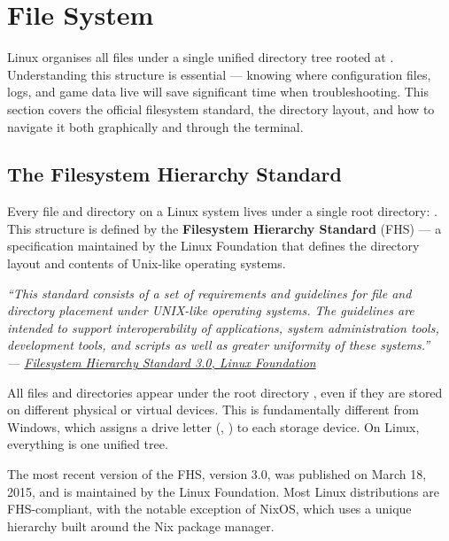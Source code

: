\documentclass{article}
\begin{document}
\newpage
\section{File System}

Linux organises all files under a single unified directory tree rooted at \directory{/}.
Understanding this structure is essential --- knowing where configuration files, logs,
and game data live will save significant time when troubleshooting. This section covers
the official filesystem standard, the directory layout, and how to navigate it both
graphically and through the terminal.

\subsection{The Filesystem Hierarchy Standard}

Every file and directory on a Linux system lives under a single root directory:
\directory{/}. This structure is defined by the \textbf{Filesystem Hierarchy
	Standard} (FHS) --- a specification maintained by the Linux Foundation that defines
the directory layout and contents of Unix-like operating systems.

\begin{mdframed}[linewidth=1.5pt, linecolor=black!50, topline=true, bottomline=true,
	leftline=false, rightline=false, backgroundcolor=black!3]
	\small\itshape
	``This standard consists of a set of requirements and guidelines for file and
	directory placement under UNIX-like operating systems. The guidelines are intended
	to support interoperability of applications, system administration tools,
	development tools, and scripts as well as greater uniformity of these systems.''\\[4pt]
	\normalfont\small ---
	\href{https://refspecs.linuxfoundation.org/FHS_3.0/fhs/index.html}{Filesystem
		Hierarchy Standard 3.0, Linux Foundation}
\end{mdframed}

\noindent All files and directories appear under the root directory \directory{/}, even
if they are stored on different physical or virtual devices.  This is
fundamentally different from Windows, which assigns a drive letter (,
) to each storage device. On Linux, everything is one unified tree.

\begin{tcolorbox}[arc=12pt, outer arc=10pt,
	colback=blue!4!white, colframe=blue!40!black,
	title=\textbf{FHS 3.0}]
	The most recent version of the FHS, version 3.0, was published on March 18,
	2015, and is maintained by the Linux Foundation. Most Linux distributions are
	FHS-compliant, with the notable exception of NixOS, which uses a unique hierarchy
	built around the Nix package manager. 
\end{tcolorbox}
\end{document}
